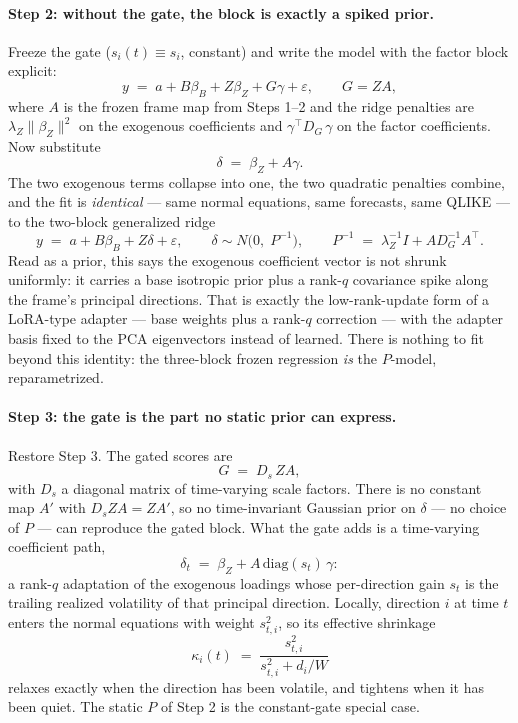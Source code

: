 \paragraph{Step 2: without the gate, the block is exactly a spiked prior.}
Freeze the gate ($s_i(t) \equiv s_i$, constant) and write the model with
the factor block explicit:
\[
y \;=\; a + B\beta_B + Z\beta_Z + G\gamma + \varepsilon,
\qquad G = ZA,
\]
where $A$ is the frozen frame map from Steps 1--2 and the ridge penalties
are $\lambda_Z \lVert \beta_Z \rVert^2$ on the exogenous coefficients and
$\gamma^{\top} D_G\, \gamma$ on the factor coefficients. Now substitute
\[
\delta \;=\; \beta_Z + A\gamma .
\]
The two exogenous terms collapse into one, the two quadratic penalties
combine, and the fit is \emph{identical} --- same normal equations, same
forecasts, same QLIKE --- to the two-block generalized ridge
\[
y \;=\; a + B\beta_B + Z\delta + \varepsilon,
\qquad
\delta \sim N\!\bigl(0,\; P^{-1}\bigr),
\qquad
P^{-1} \;=\; \lambda_Z^{-1} I + A D_G^{-1} A^{\top}.
\]
Read as a prior, this says the exogenous coefficient vector is not
shrunk uniformly: it carries a base isotropic prior plus a rank-$q$
covariance spike along the frame's principal directions. That is exactly
the low-rank-update form of a LoRA-type adapter --- base weights plus a
rank-$q$ correction --- with the adapter basis fixed to the PCA
eigenvectors instead of learned. There is nothing to fit beyond this
identity: the three-block frozen regression \emph{is} the $P$-model,
reparametrized.

\paragraph{Step 3: the gate is the part no static prior can express.}
Restore Step 3. The gated scores are
\[
G \;=\; D_s\, Z A,
\]
with $D_s$ a diagonal matrix of time-varying scale factors. There is no
constant map $A'$ with $D_s Z A = Z A'$, so no time-invariant Gaussian
prior on $\delta$ --- no choice of $P$ --- can reproduce the gated block.
What the gate adds is a time-varying coefficient path,
\[
\delta_t \;=\; \beta_Z + A\,\mathrm{diag}(s_t)\,\gamma :
\]
a rank-$q$ adaptation of the exogenous loadings whose per-direction gain
$s_t$ is the trailing realized volatility of that principal direction.
Locally, direction $i$ at time $t$ enters the normal equations with
weight $s_{t,i}^2$, so its effective shrinkage
\[
\kappa_i(t) \;=\; \frac{s_{t,i}^2}{s_{t,i}^2 + d_i / W}
\]
relaxes exactly when the direction has been volatile, and tightens when
it has been quiet. The static $P$ of Step 2 is the constant-gate special
case.

